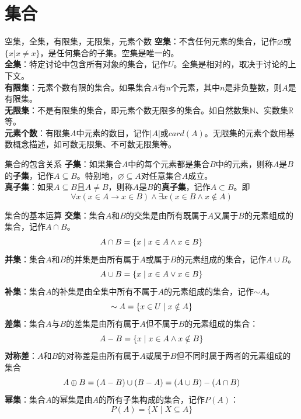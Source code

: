\documentclass[lang=cn,11pt]{elegantbook}
\newcommand{\nothing}{\ensuremath{\varnothing}}
\begin{document}
\section{集合}
\begin{definition}{空集，全集，有限集，无限集，元素个数}
\textbf{空集}：不含任何元素的集合，记作$\nothing$或$\{x|x\ne x\}$，是任何集合的子集。空集是唯一的。\\
\textbf{全集}：特定讨论中包含所有对象的集合，记作$U$。全集是相对的，取决于讨论的上下文。\\
\textbf{有限集}：元素个数有限的集合。如果集合$A$有$n$个元素，其中$n$是非负整数，则$A$是有限集。\\
\textbf{无限集}：不是有限集的集合，即元素个数无限多的集合。如自然数集$\mathbb{N}$、实数集$\mathbb{R}$等。\\
\textbf{元素个数}：有限集$A$中元素的数目，记作$|A|$或$card(A)$。无限集的元素个数用基数概念描述，如可数无限集、不可数无限集等。
\end{definition}
\begin{definition}{集合的包含关系}
    \textbf{子集}：如果集合$A$中的每个元素都是集合$B$中的元素，则称$A$是$B$的\textbf{子集}，记作$A \subseteq B$。特别地，$\varnothing\subseteq A$对任意集合$A$成立。\\
    \textbf{真子集}：如果$A \subseteq B$且$A \neq B$，则称$A$是$B$的\textbf{真子集}，记作$A \subset B$。即\vspace{-10pt}
    \[\forall x(x\in A \rightarrow x\in B) \land \exists x(x\in B \land x\notin A)\]
\end{definition}
\begin{definition}{集合的基本运算}
\textbf{交集}：集合$A$和$B$的交集是由所有既属于$A$又属于$B$的元素组成的集合，记作$A \cap B$。\vspace{-10pt}
$$A \cap B = \{x \mid x \in A \land x \in B\}\vspace{-10pt}$$
\textbf{并集}：集合$A$和$B$的并集是由所有属于$A$或属于$B$的元素组成的集合，记作$A \cup B$。\vspace{-10pt}
$$A \cup B = \{x \mid x \in A \lor x \in B\}\vspace{-10pt}$$
\textbf{补集}：集合$A$的补集是由全集中所有不属于$A$的元素组成的集合，记作$\sim  A$。\vspace{-10pt}
$$\sim A = \{x \in U \mid x \notin A\}\vspace{-10pt}$$
\textbf{差集}：集合$A$与$B$的差集是由所有属于$A$但不属于$B$的元素组成的集合：\vspace{-10pt}
$$A-B = \{x \mid x \in A \land x \notin B\}\vspace{-10pt}$$
\textbf{对称差}：$A$和$B$的对称差是由所有属于$A$或属于$B$但不同时属于两者的元素组成的集合\vspace{-10pt}
$$A\oplus B = (A - B) \cup (B -A) = (A \cup B)- (A \cap B)\vspace{-10pt}$$
\textbf{幂集}：集合$A$的幂集是由$A$的所有子集构成的集合，记作$P(A)$：\vspace{-10pt}
$$P(A) = \{X \mid X \subseteq A\}$$
\end{definition}
\end{document}
